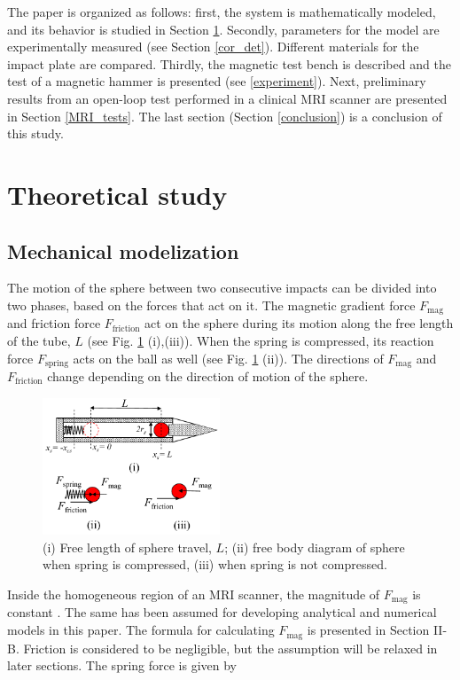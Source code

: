 \documentclass[letterpaper, 10 pt, conference]{ieeeconf}  %
\begin{document}
The paper is organized as follows: first, the system is mathematically modeled, and its behavior is studied in Section \ref{theoretical}. Secondly, parameters for the model are experimentally measured (see Section \ref{cor_det}). Different materials for the impact plate are compared. Thirdly, the magnetic test bench is described and the test of a magnetic hammer is presented (see \cref{experiment}). Next, preliminary results from an open-loop test performed in a clinical MRI scanner are presented in Section \ref{MRI_tests}. The last section (Section \ref{conclusion}) is a conclusion of this study.


\section{Theoretical study}
\label{theoretical}
\subsection{Mechanical modelization}
The motion of the sphere between two consecutive impacts can be divided into two  phases, based on the forces that act on it. The magnetic gradient force $F_{\textrm{mag}}$ and friction force $F_{\textrm{friction}}$ act on the sphere during its motion along the free length of the tube, $L$ (see Fig. \ref{FBD} (i),(iii)). When the spring is compressed, its reaction force $F_{\textrm{spring}}$ acts on the ball as well (see Fig. \ref{FBD} (ii)). The directions of $F_{\textrm{mag}}$ and $F_{\textrm{friction}}$  change depending on the direction of motion of the sphere. 
\begin{figure}
	\begin{centering}
	\includegraphics[width=150pt]{FBD_R1.pdf}
	\caption{(i) Free length of sphere travel, $L$; (ii) free body diagram of sphere when spring is compressed, (iii) when spring is not compressed.}
	\label{FBD}
	\end{centering}
	\vspace{-2em}
	\end{figure}
Inside the homogeneous region of an MRI scanner, the magnitude of $F_{\textrm{mag}}$ is constant \cite{CMR:CMR20163}. The same has been assumed for developing analytical and numerical models in this paper. The formula for calculating $F_{\textrm{mag}}$ is presented in Section II-B. Friction is considered to be negligible, but the assumption will be relaxed in later sections. The spring force is given by
\end{document}
